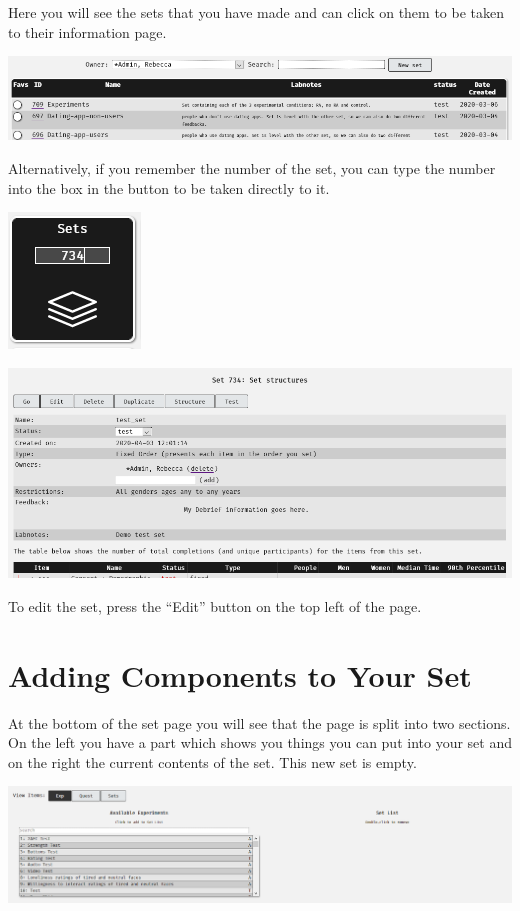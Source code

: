 \documentclass[]{book}
\begin{document}
Here you will see the sets that you have made and can click on them to
be taken to their information page.

\includegraphics{images/screenshots/sets_9.png}

Alternatively, if you remember the number of the set, you can type the
number into the box in the button to be taken directly to it.

\includegraphics{images/screenshots/sets_11.png}

\includegraphics{images/screenshots/sets_12.png}

To edit the set, press the ``Edit'' button on the top left of the page.

\section{Adding Components to Your
Set}\label{adding-components-to-your-set}

At the bottom of the set page you will see that the page is split into
two sections. On the left you have a part which shows you things you can
put into your set and on the right the current contents of the set. This
new set is empty.

\includegraphics{images/screenshots/sets_4.png}
\end{document}
